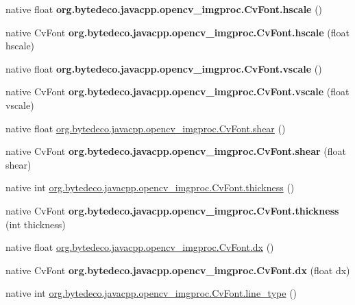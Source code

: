\begin{DoxyCompactItemize}
\item 
\mbox{\label{group__imgproc_ga7b340ce87544a4d272b8e556fd334ff0}} 
native float {\bfseries org.\+bytedeco.\+javacpp.\+opencv\+\_\+imgproc.\+Cv\+Font.\+hscale} ()
\item 
\mbox{\label{group__imgproc_gac08c92ed483fabf682df81f627403670}} 
native Cv\+Font {\bfseries org.\+bytedeco.\+javacpp.\+opencv\+\_\+imgproc.\+Cv\+Font.\+hscale} (float hscale)
\item 
\mbox{\label{group__imgproc_gabfcea1595a06b8f823538d313622379d}} 
native float {\bfseries org.\+bytedeco.\+javacpp.\+opencv\+\_\+imgproc.\+Cv\+Font.\+vscale} ()
\item 
\mbox{\label{group__imgproc_ga02b1403f770c7431187afdc32d2712e3}} 
native Cv\+Font {\bfseries org.\+bytedeco.\+javacpp.\+opencv\+\_\+imgproc.\+Cv\+Font.\+vscale} (float vscale)
\item 
native float \hyperlink{group__imgproc_ga73ceb8658b15dd4f640dae5c1ad07ac7}{org.\+bytedeco.\+javacpp.\+opencv\+\_\+imgproc.\+Cv\+Font.\+shear} ()
\item 
\mbox{\label{group__imgproc_gaed0027ae6a85378a101806b8255fb6b7}} 
native Cv\+Font {\bfseries org.\+bytedeco.\+javacpp.\+opencv\+\_\+imgproc.\+Cv\+Font.\+shear} (float shear)
\item 
native int \hyperlink{group__imgproc_ga598e4433b73866dbddf63fed41e2a5ed}{org.\+bytedeco.\+javacpp.\+opencv\+\_\+imgproc.\+Cv\+Font.\+thickness} ()
\item 
\mbox{\label{group__imgproc_gae3c8805f72bc0de310f52433402738ba}} 
native Cv\+Font {\bfseries org.\+bytedeco.\+javacpp.\+opencv\+\_\+imgproc.\+Cv\+Font.\+thickness} (int thickness)
\item 
native float \hyperlink{group__imgproc_ga294de5433e3cdf5192b9c2fd48520538}{org.\+bytedeco.\+javacpp.\+opencv\+\_\+imgproc.\+Cv\+Font.\+dx} ()
\item 
\mbox{\label{group__imgproc_gaa18cd498b852bdbaf3f05c3246529a16}} 
native Cv\+Font {\bfseries org.\+bytedeco.\+javacpp.\+opencv\+\_\+imgproc.\+Cv\+Font.\+dx} (float dx)
\item 
native int \hyperlink{group__imgproc_gaa10a37186c21769dac36657ca65b282c}{org.\+bytedeco.\+javacpp.\+opencv\+\_\+imgproc.\+Cv\+Font.\+line\+\_\+type} ()

\end{DoxyCompactItemize}
